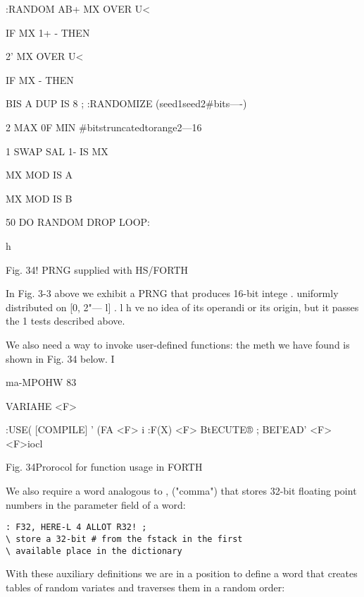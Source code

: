 :RANDOM AB+ MX OVER U<

IF MX 1+ - THEN

2' MX OVER U<

IF MX - THEN

BIS A DUP IS 8 ;
:RANDOMIZE (seed1seed2#bits—-)

2 MAX 0F MIN \#bitstruncatedtorange2—16

1 SWAP SAL 1- IS MX

MX MOD IS A

MX MOD IS B

50 DO RANDOM DROP LOOP:

 

h

Fig. 34! PRNG supplied with HS/FORTH

In Fig. 3-3 above we exhibit a PRNG that produces 16-bit intege .
uniformly distributed on [0, 2"— l] . l h ve no idea of its
operandi or its origin, but it passes the 1 tests described above.

We also need a way to invoke user-defined functions: the meth
we have found is shown in Fig. 34 below. I

ma-MPOHW 83

 

VARIAHE <F>

:USE( [COMPILE] ' (FA <F> i
:F(X) <F> BtECUTE® ;
BEI'EAD' <F> \rrllto<F>iocl

 

 

 

Fig. 34Prorocol for function usage in FORTH

We also require a word analogous to , ("comma") that stores
32-bit floating point numbers in the parameter field of a word:

\begin{verbatim}
: F32, HERE-L 4 ALLOT R32! ;
\ store a 32-bit # from the fstack in the first
\ available place in the dictionary
\end{verbatim}

With these auxiliary definitions we are in a position to define a
word that creates tables of random variates and traverses them in a random order:

